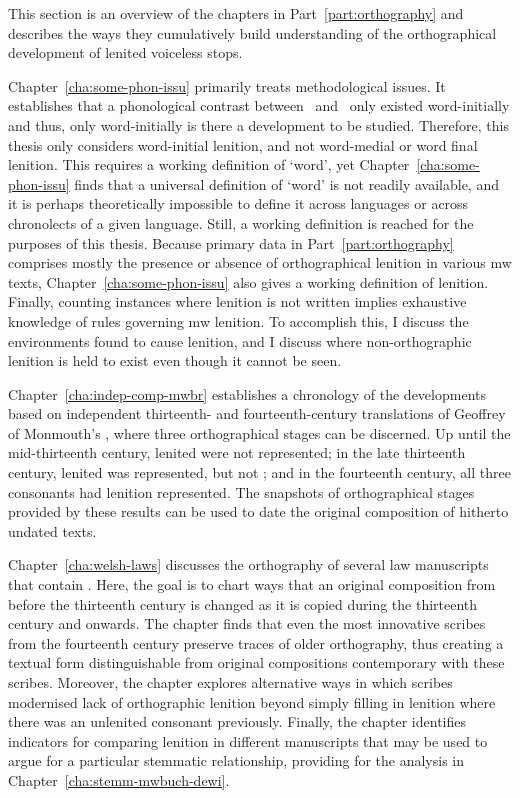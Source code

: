 This section is an overview of the chapters in Part~\ref{part:orthography} and describes the ways they  cumulatively build understanding of the orthographical development of lenited voiceless stops.

Chapter~\ref{cha:some-phon-issu} primarily treats methodological issues. It establishes that a phonological contrast between \lT\ and \xD\ only existed word-initially and thus, only word-initially is there a development to be studied. Therefore, this thesis  only considers word-initial lenition, and not word-medial or word final lenition. This requires a working definition of `word', yet Chapter~\ref{cha:some-phon-issu} finds that a universal definition of `word' is not readily available, and it is perhaps theoretically impossible to define it across languages or across chronolects of a given language. Still, a working definition is reached for the purposes of this thesis. Because primary data in Part~\ref{part:orthography} comprises mostly the presence or absence of orthographical lenition in various \gls{mw} texts,  Chapter~\ref{cha:some-phon-issu} also gives a working definition of lenition. Finally, counting instances where lenition is not written implies exhaustive knowledge of rules governing \gls{mw} lenition. To accomplish this, I discuss the environments  found to cause lenition, and I discuss where
non-orthographic lenition is held to exist even though it cannot be seen.

Chapter~\ref{cha:indep-comp-mwbr} establishes a chronology of the developments based on independent thirteenth- and fourteenth-century translations of Geoffrey of Monmouth's , where three orthographical stages can be discerned. Up until the mid-thirteenth century, lenited  were not represented; in the late thirteenth century, lenited  was represented, but not ; and in the fourteenth century, all three consonants had lenition represented. The snapshots of orthographical stages provided by these results can be used to date the original composition of hitherto undated texts.

Chapter~\ref{cha:welsh-laws} discusses the orthography of several law manuscripts that contain . Here, the goal is to chart ways that an original composition from before the  thirteenth century is changed as it is copied during the thirteenth century and onwards. The chapter finds that even the most innovative scribes from the fourteenth century preserve traces of older orthography, thus creating a textual form distinguishable from original compositions contemporary with these scribes. Moreover, the chapter explores  alternative ways in which scribes modernised lack of orthographic lenition beyond simply filling in lenition where there was an unlenited consonant previously. Finally, the chapter identifies indicators for comparing lenition in different manuscripts that may be used to argue for a particular stemmatic relationship, providing for the analysis in Chapter~\ref{cha:stemm-mwbuch-dewi}.

